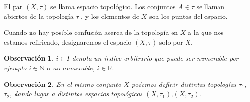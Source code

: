 \documentclass{book}
\newtheorem{obs}{Observación}[chapter]
\newcommand{\R}{\mathbb{R}}
\newcommand{\N}{\mathbb{N}}
\begin{document}
El par $(X,\tau)$ se llama espacio topológico. Los conjuntos $A \in \tau$ se llaman abiertos de la topología $\tau$ , y los elementos de $X$ son los puntos del espacio.

Cuando no hay posible confusión acerca de la topología en $X$ a la que nos estamos refiriendo, designaremos el espacio $(X,\tau)$ solo por
$X$.

\begin{obs} $i\in I$ denota un indice arbitrario que puede ser numerable por ejemplo $i \in \N$ o no numerable, $i \in \R$.\end{obs}

\begin{obs} 
En el mismo conjunto $X$ podemos definir distintas topologías $\tau_1$, $\tau_2$, dando lugar a distintos espacios topológicos $(X,\tau_1)$,$(X,\tau_2)$.
\end{obs}
\end{document}
